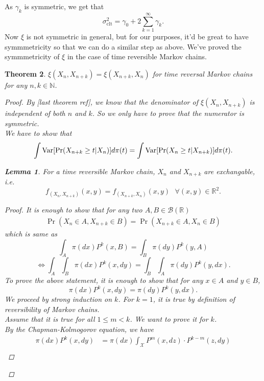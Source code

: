 \documentclass{article}
\newtheorem{theorem}{Theorem}[section]
\newtheorem{lemma}[theorem]{Lemma}
\begin{document}
	As $\gamma_k$ is symmetric, we get that
	$$\sigma_{\text{clt}}^2 = \gamma_0 + 2\sum_{k=1}^{\infty} \gamma_k.$$
	Now $\xi$ is not symmetric in general, but for our purposes, it'd be great to have symmmetricity so that we can do a similar step as above.
	We've proved the symmmetricity of $\xi$ in the case of time reversible Markov chains.

	\begin{theorem}
		$\xi(X_n, X_{n+k}) = \xi(X_{n+k}, X_n)$ for time reversal Markov chains for any $n, k \in \mathbb{N}$.
		\begin{proof}
			By [last theorem ref], we know that the denominator of $\xi(X_n, X_{n+k})$ is independent of both $n$ and $k$. So we only have to prove that the numerator is symmetric. \\
			We have to show that
			\begin{equation*}
				\int \text{Var} [\Pr (X_{n+k} \geq t | X_n)] d\pi(t) = \int \text{Var} [\Pr (X_n \geq t | X_{n+k})] d\pi(t).
			\end{equation*}
			\begin{lemma}
				For a time reversible Markov chain, $X_n$ and $X_{n+k}$ are exchangable, i.e.
				\begin{equation*}
					f_{(X_{n}, X_{n+k})}(x, y) = f_{(X_{n+k}, X_{n})}(x, y) \text{  } \forall (x, y) \in \mathbb{R}^2.
				\end{equation*}
				\begin{proof}
					It is enough to show that for any two $A, B \in \mathcal{B}(\mathbb{R})$
					\begin{align*}
						\Pr(X_n \in A, X_{n+k} \in B) = \Pr(X_{n+k} \in A, X_{n} \in B)
					\end{align*}
					which is same as
						$$\int_A \pi(dx) P^k(x, B) = \int_B \pi(dy) P^k(y, A)$$
						$$\Longleftrightarrow\int_A \int_B \pi(dx) P^k(x, dy) = \int_B \int_A \pi(dy) P^k(y, dx).$$
					To prove the above statement, it is enough to show that for any $x \in A$ and $y \in B$,
					$$\pi(dx) P^k(x, dy) = \pi(dy) P^k(y, dx).$$
					We proceed by strong induction on $k$.
					For $k = 1$, it is true by definition of reversibility of Markov chains.\\
					Assume that it is true for all $1 \leq m < k$.
					We want to prove it for $k$.\\
					By the Chapman-Kolmogorov equation, we have
					\begin{align*}
						\pi(dx) P^k(x, dy) &= \pi(dx) \int_{\mathcal{X}} P^m(x, dz)\cdot P^{k-m}(z, dy)\\

\end{align*}
\end{proof}
\end{lemma}
\end{proof}
\end{theorem}
\end{document}
